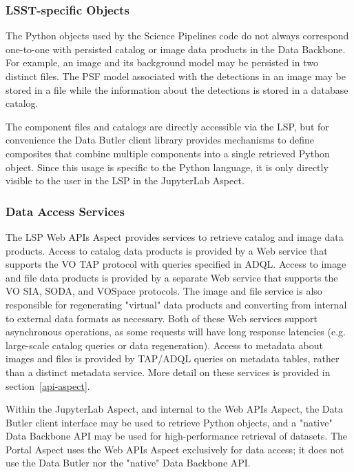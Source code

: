 \subsubsection{LSST-specific Objects}\label{lsst-specific-objects}

The Python objects used by the Science Pipelines code do not always
correspond one-to-one with persisted catalog or image data products in the
Data Backbone.  For example, an image and its background model may be persisted
in two distinct files.  The PSF model associated with the detections in an
image may be stored in a file while the information about the detections is
stored in a database catalog.

The component files and catalogs are directly accessible via the LSP, but
for convenience the Data Butler client library provides mechanisms to define
composites that combine multiple components into a single retrieved Python
object.  Since this usage is specific to the Python language, it is only
directly visible to the user in the LSP in the JupyterLab Aspect.

\subsubsection{Data Access Services}\label{data-access-services}

The LSP Web APIs Aspect provides services to retrieve catalog and image data
products.  Access to catalog data products is provided by a Web service that
supports the VO TAP protocol with queries specified in ADQL.  Access to image
and file data products is provided by a separate Web service that supports the
VO SIA, SODA, and VOSpace protocols.  The image and file service is also
responsible for regenerating "virtual" data products and converting from
internal to external data formats as necessary.  Both of these Web services
support asynchronous operations, as some requests will have long response
latencies (e.g.  large-scale catalog queries or data regeneration).  Access to
metadata about images and files is provided by TAP/ADQL queries on metadata
tables, rather than a distinct metadata service.  More detail on these services
is provided in section~\ref{api-aspect}.

Within the JupyterLab Aspect, and internal to the Web APIs Aspect, the Data
Butler client interface may be used to retrieve Python objects, and a
"native" Data Backbone API may be used for high-performance retrieval of
datasets.  The Portal Aspect uses the Web APIs Aspect exclusively for data
access; it does not use the Data Butler nor the "native" Data Backbone API.

